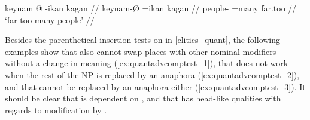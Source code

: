 \ex\label{ex:clitics_55_short}%
\begingl
	\gla keynam @ -ikan kagan //
	\glb keynam-Ø =ikan kagan //
	\glc people-\Top{} =many far.too //
	\glft `far too many people' //
\endgl~\\



\xe

Besides the parenthetical insertion tests on  in
\autoref{clitics_quant}, the following examples show that 
also cannot swap places with other nominal modifiers without a change in
meaning (\ref{ex:quantadvcomptest_1}), that  does not work
when the rest of the NP is replaced by an anaphora
(\ref{ex:quantadvcomptest_2}), and that  cannot be replaced
by an anaphora either (\ref{ex:quantadvcomptest_3}). It should be
clear that  is dependent on , and that 
 has head-like qualities with regards to modification by
.


